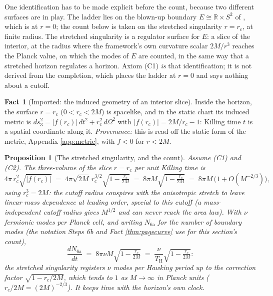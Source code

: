 \documentclass[11pt]{article}
\newtheorem{proposition}[theorem]{Proposition}
\theoremstyle{definition}
\newtheorem{fact}[theorem]{Fact}
\newcommand{\R}{\mathbb{R}}
\renewcommand{\TH}{T_{\mathrm{H}}} %
\begin{document}
One identification has to be made explicit before the count, because two different surfaces are in play. The ladder lies on the blown-up boundary $E \cong \R \times S^{2}$ of \cite[\S 8]{ButlerT4}, which is at $r = 0$; the count below is taken on the stretched singularity $r = r_c$, at finite radius. The stretched singularity is a regulator surface for $E$: a slice of the interior, at the radius where the framework's own curvature scalar $2M/r^{3}$ reaches the Planck value, on which the modes of $E$ are counted, in the same way that a stretched horizon regulates a horizon. Axiom (C1) \emph{is} that identification; it is not derived from the completion, which places the ladder at $r = 0$ and says nothing about a cutoff.

\begin{fact}[Imported: the induced geometry of an interior slice]\label{fact:slice}
Inside the horizon, the surface $r = r_c$ ($0 < r_c < 2M$) is spacelike, and in the static chart its induced metric is $ds_3^{2} = |f(r_c)|\,dt^{2} + r_c^{2}\,d\Omega^{2}$ with $|f(r_c)| = 2M/r_c - 1$: Killing time $t$ is a spatial coordinate along it. \emph{Provenance:} this is read off the static form of the metric, Appendix \ref{app:metric}, with $f < 0$ for $r < 2M$.
\end{fact}

\begin{proposition}[The stretched singularity, and the count]\label{prop:count}
Assume (C1) and (C2). The three-volume of the slice $r = r_c$ per unit Killing time is
\[
4\pi\,r_c^{2}\sqrt{|f(r_c)|} \;=\; 4\pi\sqrt{2M}\,r_c^{3/2}\sqrt{1 - \tfrac{r_c}{2M}} \;=\; 8\pi M\sqrt{1 - \tfrac{r_c}{2M}} \;=\; 8\pi M\,\bigl(1 + O(M^{-2/3})\bigr) ,
\]
using $r_c^{3} = 2M$: the cutoff radius conspires with the anisotropic stretch to leave \emph{linear} mass dependence at leading order, special to this cutoff (a mass-independent cutoff radius gives $M^{1/2}$ and can never reach the area law). With $\nu$ fermionic modes per Planck cell, and writing $N_{\mathrm{6a}}$ for the number of boundary modes (the notation Steps 6b and Fact \ref{thm:pagecurve} use for this section's count),
\[
\frac{dN_{\mathrm{6a}}}{dt} \;=\; 8\pi\nu M\sqrt{1 - \tfrac{r_c}{2M}} \;=\; \frac{\nu}{\TH}\sqrt{1 - \tfrac{r_c}{2M}} :
\]
the stretched singularity registers $\nu$ modes per Hawking period up to the correction factor $\sqrt{1 - r_c/2M}$, which tends to $1$ as $M \to \infty$ in Planck units ($r_c/2M = (2M)^{-2/3}$). It keeps time with the horizon's own clock.
\end{proposition}
\end{document}
